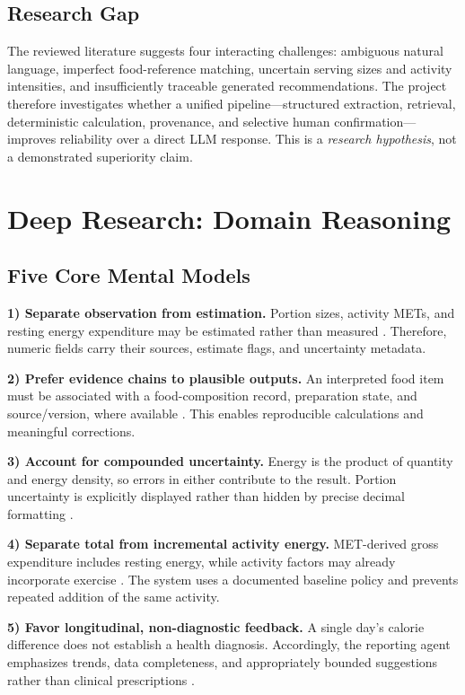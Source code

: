 \documentclass[journal,10pt]{IEEEtran}
\begin{document}
\subsection{Research Gap}
The reviewed literature suggests four interacting challenges: ambiguous natural language, imperfect food-reference matching, uncertain serving sizes and activity intensities, and insufficiently traceable generated recommendations. The project therefore investigates whether a unified pipeline---structured extraction, retrieval, deterministic calculation, provenance, and selective human confirmation---improves reliability over a direct LLM response. This is a \emph{research hypothesis}, not a demonstrated superiority claim.

\section{Deep Research: Domain Reasoning}
\subsection{Five Core Mental Models}
\textbf{1) Separate observation from estimation.} Portion sizes, activity METs, and resting energy expenditure may be estimated rather than measured \cite{imageeval,compendium,mifflin}. Therefore, numeric fields carry their sources, estimate flags, and uncertainty metadata.

\textbf{2) Prefer evidence chains to plausible outputs.} An interpreted food item must be associated with a food-composition record, preparation state, and source/version, where available \cite{lemay,usda}. This enables reproducible calculations and meaningful corrections.

\textbf{3) Account for compounded uncertainty.} Energy is the product of quantity and energy density, so errors in either contribute to the result. Portion uncertainty is explicitly displayed rather than hidden by precise decimal formatting \cite{nutrients,imageeval}.

\textbf{4) Separate total from incremental activity energy.} MET-derived gross expenditure includes resting energy, while activity factors may already incorporate exercise \cite{compendium,mifflin}. The system uses a documented baseline policy and prevents repeated addition of the same activity.

\textbf{5) Favor longitudinal, non-diagnostic feedback.} A single day's calorie difference does not establish a health diagnosis. Accordingly, the reporting agent emphasizes trends, data completeness, and appropriately bounded suggestions rather than clinical prescriptions \cite{who}.
\end{document}
